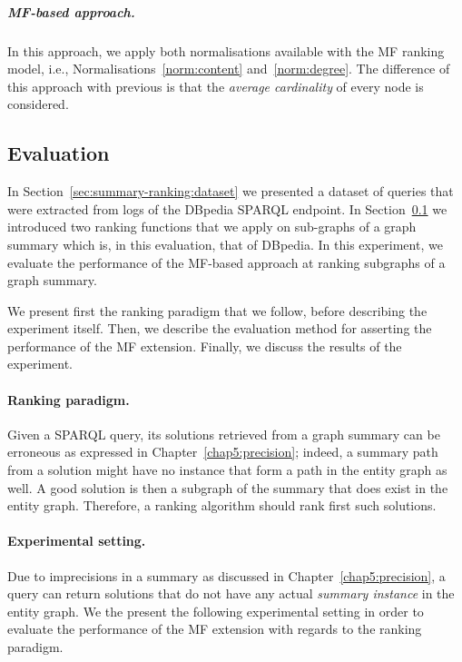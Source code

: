 
\subparagraph{MF-based approach.}

In this approach, we apply both normalisations available with the \gls{MF} ranking model, i.e., Normalisations~\ref{norm:content} and~\ref{norm:degree}. The difference of this approach with previous is that the \emph{average cardinality} of every node is considered.

\subsection{Evaluation}
\label{sec:summary-ranking:eval}

In Section~\ref{sec:summary-ranking:dataset} we presented a dataset of queries that were extracted from logs of the DBpedia SPARQL endpoint. In Section~\ref{sec:summary-ranking:eval} we introduced two ranking functions that we apply on sub-graphs of a graph summary which is, in this evaluation, that of DBpedia.
In this experiment, we evaluate the performance of the \gls{MF}-based approach at ranking subgraphs of a graph summary.

We present first the ranking paradigm that we follow, before describing the experiment itself. Then, we describe the evaluation method for asserting the performance of the \gls{MF} extension. Finally, we discuss the results of the experiment.

\paragraph{Ranking paradigm.}

Given a SPARQL query, its solutions retrieved from a graph summary can be erroneous as expressed in Chapter~\ref{chap5:precision}; indeed, a summary path from a solution might have no instance that form a path in the entity graph as well. A good solution is then a subgraph of the summary that does exist in the entity graph. Therefore, a ranking algorithm should rank first such solutions.

\paragraph{Experimental setting.}

Due to imprecisions in a summary as discussed in Chapter~\ref{chap5:precision}, a query can return solutions that do not have any actual \emph{summary instance} in the entity graph. We the present the following experimental setting in order to evaluate the performance of the \gls{MF} extension with regards to the ranking paradigm.\\

